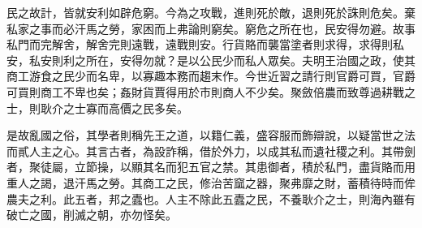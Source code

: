 \begin{pinyinscope}
民之故計，皆就安利如辟危窮。今為之攻戰，進則死於敵，退則死於誅則危矣。棄私家之事而必汗馬之勞，家困而上弗論則窮矣。窮危之所在也，民安得勿避。故事私門而完解舍，解舍完則遠戰，遠戰則安。行貨賂而襲當塗者則求得，求得則私安，私安則利之所在，安得勿就？是以公民少而私人眾矣。夫明王治國之政，使其商工游食之民少而名卑，以寡趣本務而趨末作。今世近習之請行則官爵可買，官爵可買則商工不卑也矣；姦財貨賈得用於市則商人不少矣。聚斂倍農而致尊過耕戰之士，則耿介之士寡而高價之民多矣。

是故亂國之俗，其學者則稱先王之道，以籍仁義，盛容服而飾辯說，以疑當世之法而貳人主之心。其言古者，為設詐稱，借於外力，以成其私而遺社稷之利。其帶劍者，聚徒屬，立節操，以顯其名而犯五官之禁。其患御者，積於私門，盡貨賂而用重人之謁，退汗馬之勞。其商工之民，修治苦窳之器，聚弗靡之財，蓄積待時而侔農夫之利。此五者，邦之蠹也。人主不除此五蠹之民，不養耿介之士，則海內雖有破亡之國，削滅之朝，亦勿怪矣。


\end{pinyinscope}